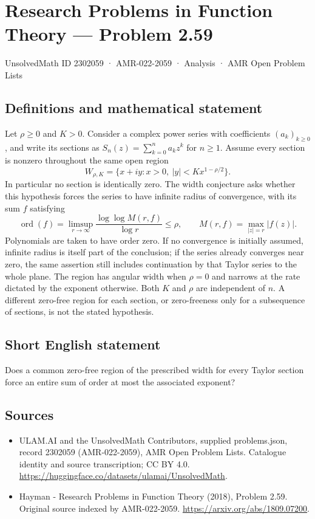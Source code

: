 \documentclass[11pt,a4paper]{article}
\begin{document}
\section*{Research Problems in Function Theory — Problem 2.59}\label{2302059}
{\small UnsolvedMath ID 2302059 · AMR-022-2059 · Analysis · AMR Open Problem Lists}
\subsection{Definitions and mathematical statement}
Let $\rho\ge0$ and $K>0$. Consider a complex power series with coefficients $(a_k)_{k\ge0}$, and write its sections as
$S_n(z)=\sum_{k=0}^na_kz^k$ for $n\ge1$.
Assume every section is nonzero throughout the same open region
\[
W_{\rho,K}=\{x+iy:x>0,\ |y|<Kx^{1-\rho/2}\}.
\]
In particular no section is identically zero. The width conjecture asks whether this hypothesis forces the series to have infinite radius of convergence, with its sum $f$ satisfying
\[
\operatorname{ord}(f)=\limsup_{r\to\infty}
\frac{\log\log M(r,f)}{\log r}\le\rho,
\qquad M(r,f)=\max_{|z|=r}|f(z)|.
\]
Polynomials are taken to have order zero. If no convergence is initially assumed, infinite radius is itself part of the conclusion; if the series already converges near zero, the same assertion still includes continuation by that Taylor series to the whole plane.
The region has angular width when $\rho=0$ and narrows at the rate dictated by the exponent otherwise. Both $K$ and $\rho$ are independent of $n$. A different zero-free region for each section, or zero-freeness only for a subsequence of sections, is not the stated hypothesis.
\subsection{Short English statement}
Does a common zero-free region of the prescribed width for every Taylor section force an entire sum of order at most the associated exponent?
\subsection{Sources}
\begin{itemize}
\item[S1] ULAM.AI and the UnsolvedMath Contributors, supplied problems.json, record 2302059 (AMR-022-2059), AMR Open Problem Lists. Catalogue identity and source transcription; CC BY 4.0.
\url{https://huggingface.co/datasets/ulamai/UnsolvedMath}.
\item[S2] Hayman - Research Problems in Function Theory (2018), Problem 2.59. Original source indexed by AMR-022-2059.
\url{https://arxiv.org/abs/1809.07200}.
\end{itemize}
\end{document}
